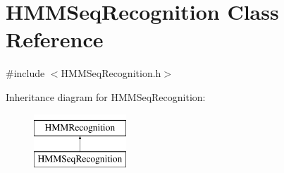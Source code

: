 \hypertarget{class_h_m_m_seq_recognition}{\section{H\+M\+M\+Seq\+Recognition Class Reference}
\label{class_h_m_m_seq_recognition}
}


{\ttfamily \#include $<$H\+M\+M\+Seq\+Recognition.\+h$>$}

Inheritance diagram for H\+M\+M\+Seq\+Recognition\+:\begin{figure}[H]
\begin{center}
\leavevmode
\includegraphics[height=2.000000cm]{class_h_m_m_seq_recognition}
\end{center}
\end{figure}
